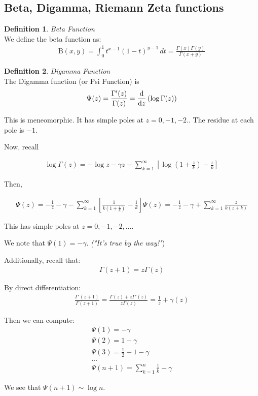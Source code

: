 \documentclass{article}
\theoremstyle{definition}
\newtheorem{definition}{Definition}[section]
\newcommand{\Def}[2]{
\begin{shaded*}
\begin{definition}{\textit{#1}}\\#2\end{definition}
\end{shaded*}
}
\begin{document}
\subsection{Beta, Digamma, Riemann Zeta functions}

\Def{Beta Function}{
We define the beta function as:
\begin{align*}
 \mathrm{B} (x,y)=\int _{0}^{1}t^{x-1}(1-t)^{y-1}\,dt
 = \frac{\Gamma(x)\Gamma(y)}{\Gamma(x+y)}
  \end{align*}
}

\Def{Digamma Function}{
The Digamma function (or Psi Function) is
\begin{align*}
\Psi (z) = \frac{\Gamma'(z)}{\Gamma(z)} = \dv{z} \left(\log \Gamma(z)\right)
\end{align*}

This is meneomorphic. It has simple poles at $z=0, -1, -2..$ The residue at each pole is $-1$. 

Now, recall

\begin{align*}
\log \Gamma(z) = -\log z - \gamma z - \sum_{k=1}^\infty \left[\log(1+\frac{z}{k}) - \frac{z}{k}\right]
\end{align*}

Then, 

\begin{align*}
\Psi(z) = - \frac{1}{z} - \gamma  - \sum_{k=1}^\infty \left[\frac{1}{k(1+\frac{z}{k})} - \frac{1}{k}\right]
\Psi(z) = - \frac{1}{z} - \gamma  + \sum_{k=1}^\infty \frac{z}{k(z+k)}
\end{align*}

This has simple poles at $z=0,-1,-2,...$. 

We note that $\Psi(1) = -\gamma$. \textit{("It's true by the way!"}) 

Additionally, recall that:
\begin{align*}
\Gamma(z+1) = z\Gamma(z) 
\end{align*}

By direct differentiation:
\begin{align*}
\frac{\Gamma'(z+1)}{\Gamma(z+1)} = \frac{\Gamma(z) + z \Gamma'(z)}{z \Gamma(z)} = \frac{1}{z} + \gamma(z)
\end{align*}

Then we can compute:
\begin{align*}
\Psi(1) = -\gamma\\
\Psi(2) = 1-\gamma \\ 
\Psi(3) = \frac{1}{2} + 1 - \gamma \\
...\\
\Psi(n+1) = \sum_{k=1}^{n} \frac{1}{k} - \gamma
\end{align*}

We see that $\Psi(n+1) \sim \log n$. 
}
\end{document}
